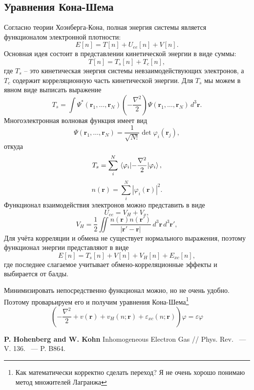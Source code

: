 \documentclass[article]{ncc}
\newcommand{\eps}{\varepsilon}
\renewcommand{\phi}{\varphi}
\renewcommand{\vec}{\boldsymbol}
\begin{document}
    \subsection{Уравнения Кона-Шема}
    Согласно теории Хоэнберга-Кона, полная энергия системы является функционалом электронной плотности:
    \begin{equation}
        E[n] = T[n] + U_{ee}[n] + V[n].
    \end{equation}
    Основная идея состоит в представлении кинетической энергии в виде суммы:
    \begin{equation}
        T[n] = T_s[n] + T_c[n],
    \end{equation}
    где \( T_s \) -- это кинетическая энергия системы невзаимодействующих электронов, а \( T_c \) содержит корреляционную часть кинетической энергии. Для \( T_s \) мы можем в явном виде выписать выражение
    \begin{equation}
        T_s = \int \Psi^*(\vec{r}_1, \ldots, \vec{r}_N) \left(-\frac{\nabla^2}{2}\right) \Psi(\vec{r}_1, \ldots, \vec{r}_N)\,d^3\vec{r}.
    \end{equation}
    Многоэлектронная волновая функция имеет вид
    \begin{equation}
        \Psi(\vec{r}_1, \ldots, \vec{r}_N) = \frac{1}{\sqrt{N!}}\det \phi_i(\vec{r}_j),
    \end{equation}
    откуда
    \begin{equation}
        T_s = \sum_{i}^N\expval{-\frac{\nabla^2}{2}}{\phi_i},
    \end{equation}
    \begin{equation}
        n(\vec{r}) = \sum_{i}^N|\phi_i(\vec{r})|^2.
    \end{equation}
    Функционал взаимодействия электронов можно представить в виде
    \begin{equation}
        U_{ee} = V_H + V_x,
    \end{equation}
    \begin{equation}
        V_H = \frac{1}{2}\iint \frac{n(\vec{r})n(\vec{r}')}{|\vec{r}' - \vec{r}|}\,d^3\vec{r}\,d^3\vec{r}',
    \end{equation}
    Для учёта корреляции и обмена не существует нормального выражения, поэтому функционал энергии представляют в виде
    \begin{equation}
        E[n] = T_s[n] + V[n] + V_H[n] + E_{xc}[n],
    \end{equation}
    где последнее слагаемое учитывает обмено-корреляционные эффекты и выбирается от балды.
    
    Минимизировать непосредственно функционал можно, но не очень удобно. Поэтому проварьируем его и получим уравнения Кона-Шема\footnote{Как математически корректно сделать переход? Я не очень хорошо понимаю метод множителей Лагранжа}
    \begin{equation}
        \left(-\frac{\nabla^2}{2} + v(\vec{r}) + v_H(n;\vec{r}) + \eps_{xc}(n;\vec{r})\right)\phi = \eps\phi
    \end{equation}
    \begin{thebibliography}{99}
         \textbf{P. Hohenberg and W. Kohn} Inhomogeneous Electron Gas // Phys. Rev. ~--- V. 136. ~--- P. B864.
    \end{thebibliography}
\end{document}
